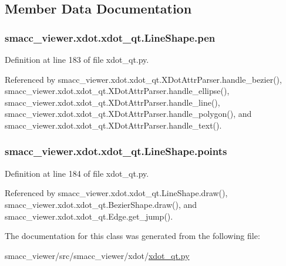 \subsection{Member Data Documentation}
\subsubsection[{\texorpdfstring{pen}{pen}}]{\setlength{\rightskip}{0pt plus 5cm}smacc\+\_\+viewer.\+xdot.\+xdot\+\_\+qt.\+Line\+Shape.\+pen}\hypertarget{classsmacc__viewer_1_1xdot_1_1xdot__qt_1_1LineShape_a60b9ba07ca324d8cb3710db7850975b2}{}\label{classsmacc__viewer_1_1xdot_1_1xdot__qt_1_1LineShape_a60b9ba07ca324d8cb3710db7850975b2}


Definition at line 183 of file xdot\+\_\+qt.\+py.



Referenced by smacc\+\_\+viewer.\+xdot.\+xdot\+\_\+qt.\+X\+Dot\+Attr\+Parser.\+handle\+\_\+bezier(), smacc\+\_\+viewer.\+xdot.\+xdot\+\_\+qt.\+X\+Dot\+Attr\+Parser.\+handle\+\_\+ellipse(), smacc\+\_\+viewer.\+xdot.\+xdot\+\_\+qt.\+X\+Dot\+Attr\+Parser.\+handle\+\_\+line(), smacc\+\_\+viewer.\+xdot.\+xdot\+\_\+qt.\+X\+Dot\+Attr\+Parser.\+handle\+\_\+polygon(), and smacc\+\_\+viewer.\+xdot.\+xdot\+\_\+qt.\+X\+Dot\+Attr\+Parser.\+handle\+\_\+text().

\subsubsection[{\texorpdfstring{points}{points}}]{\setlength{\rightskip}{0pt plus 5cm}smacc\+\_\+viewer.\+xdot.\+xdot\+\_\+qt.\+Line\+Shape.\+points}\hypertarget{classsmacc__viewer_1_1xdot_1_1xdot__qt_1_1LineShape_a815cd548c33d9d5b05f521cd6a9fa1ca}{}\label{classsmacc__viewer_1_1xdot_1_1xdot__qt_1_1LineShape_a815cd548c33d9d5b05f521cd6a9fa1ca}


Definition at line 184 of file xdot\+\_\+qt.\+py.



Referenced by smacc\+\_\+viewer.\+xdot.\+xdot\+\_\+qt.\+Line\+Shape.\+draw(), smacc\+\_\+viewer.\+xdot.\+xdot\+\_\+qt.\+Bezier\+Shape.\+draw(), and smacc\+\_\+viewer.\+xdot.\+xdot\+\_\+qt.\+Edge.\+get\+\_\+jump().



The documentation for this class was generated from the following file\+:\begin{DoxyCompactItemize}
\item 
smacc\+\_\+viewer/src/smacc\+\_\+viewer/xdot/\hyperlink{xdot__qt_8py}{xdot\+\_\+qt.\+py}\end{DoxyCompactItemize}
